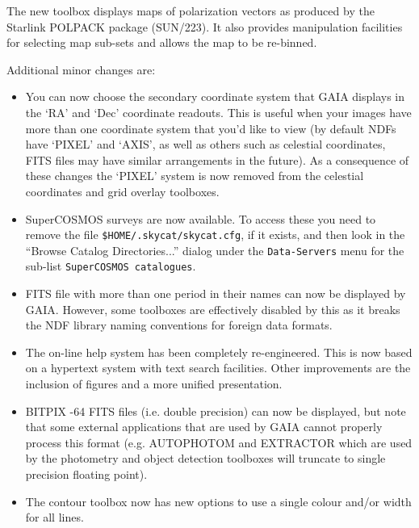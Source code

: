 \documentclass[twoside,11pt]{article}
\newcommand{\xref}[3]{#1}
\renewcommand{\_}{\texttt{\symbol{95}}}
\newcommand{\mytt}[1]{{\texttt{#1}}}
\begin{document}
  The new toolbox displays maps of polarization vectors as produced by
  the Starlink POLPACK package (\xref{SUN/223}{sun223}{}). It also
  provides manipulation facilities for selecting map sub-sets and
  allows the map to be re-binned.

  Additional minor changes are:
  \begin{itemize}
     \item You can now choose the secondary coordinate system that GAIA
       displays in the `RA' and `Dec' coordinate readouts. This is
       useful when your images have more than one coordinate system that
       you'd like to view (by default NDFs have `PIXEL' and `AXIS', as
       well as others such as celestial coordinates, FITS files may have
       similar arrangements in the future). As a consequence of these
       changes the `PIXEL' system is now removed from the celestial
       coordinates and grid overlay toolboxes.

     \item SuperCOSMOS surveys are now available. To access these you need
       to remove the file \mytt{\$HOME/.skycat/skycat.cfg}, if it
       exists, and then look in the ``Browse Catalog Directories...''
       dialog under the \mytt{Data-Servers} menu for the sub-list
       \mytt{SuperCOSMOS catalogues}. 


     \item FITS file with more than one period in their names can now be
       displayed by GAIA. However, some toolboxes are effectively
       disabled by this as it breaks the \xref{NDF}{sun33}{} library
       naming conventions for foreign data formats.

     \item The on-line help system has been completely
       re-engineered. This is now based on a hypertext system with text
       search facilities.  Other improvements are the inclusion of
       figures and a more unified presentation.

     \item BITPIX -64 FITS files (i.e. double precision) can now be
       displayed, but note that some external applications that are
       used by GAIA cannot properly process this format
       (e.g. \xref{AUTOPHOTOM}{sun45}{AUTOPHOTOM} and
       \xref{EXTRACTOR}{sun226}{} which are used by the photometry 
       and object detection toolboxes will truncate to single
       precision floating point). 

     \item The contour toolbox now has new options to use a single colour
       and/or width for all lines.


\end{itemize}
\end{document}
